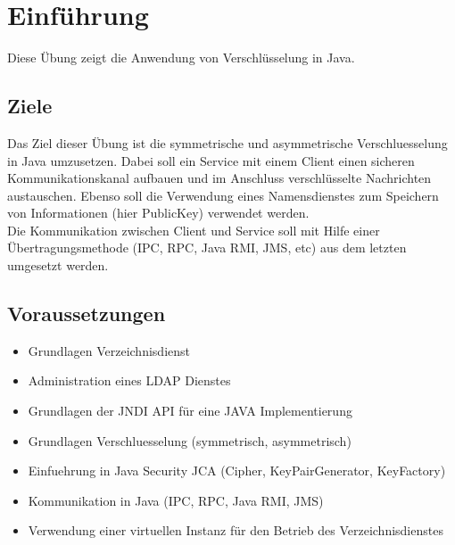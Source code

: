 \documentclass[letterpaper, 12pt]{article}
\let\tempsection\section
\renewcommand\section[1]{\vspace{-0.3cm}\tempsection{#1}\vspace{-0.3cm}}
\let\tempsubsection\subsection
\renewcommand\subsection[1]{\vspace{0cm}\tempsubsection{#1}\vspace{0cm}}
\begin{document}
\parindent 0pt
\parskip 6pt



\clearpage
\thispagestyle{empty}
\tableofcontents

\newpage
{}
\pagestyle{fancy}

\section{Einführung}
Diese Übung zeigt die Anwendung von Verschlüsselung in Java.
\subsection{Ziele}
Das Ziel dieser Übung ist die symmetrische und asymmetrische Verschluesselung in Java umzusetzen. Dabei soll ein Service mit einem Client einen sicheren Kommunikationskanal aufbauen und im Anschluss verschlüsselte Nachrichten austauschen. Ebenso soll die Verwendung eines Namensdienstes zum Speichern von Informationen (hier PublicKey) verwendet werden. \\
Die Kommunikation zwischen Client und Service soll mit Hilfe einer Übertragungsmethode (IPC, RPC, Java RMI, JMS, etc) aus dem letzten umgesetzt werden.
\subsection{Voraussetzungen}
\begin{itemize}
	\item Grundlagen Verzeichnisdienst
	\item Administration eines LDAP Dienstes
	\item Grundlagen der JNDI API für eine JAVA Implementierung
	\item Grundlagen Verschluesselung (symmetrisch, asymmetrisch)
	\item Einfuehrung in Java Security JCA (Cipher, KeyPairGenerator, KeyFactory)
	\item Kommunikation in Java (IPC, RPC, Java RMI, JMS)
	\item Verwendung einer virtuellen Instanz für den Betrieb des Verzeichnisdienstes
\end{itemize}
\end{document}
